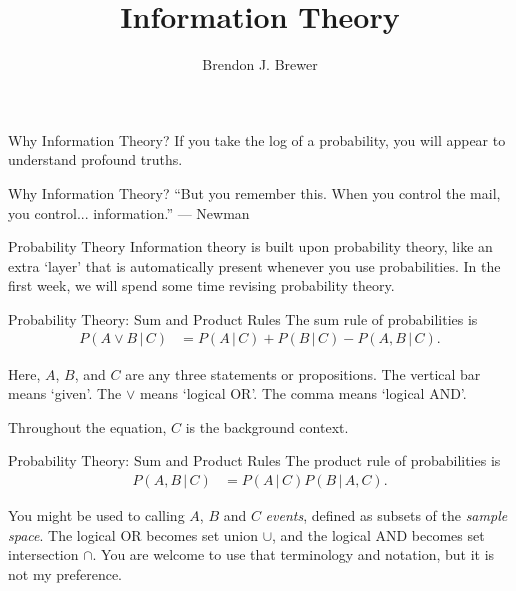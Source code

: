 \documentclass{beamer}
\title{Information Theory}
\author{Brendon J. Brewer}
\newcommand{\given}{\,|\,}
\begin{document}
\maketitle

\begin{frame}{Why Information Theory?}
If you take the log of a probability, you will appear to understand
profound truths.

\end{frame}


\begin{frame}{Why Information Theory?}
``But you remember this. When you control the mail, you control... information.''
--- Newman
\end{frame}


\begin{frame}{Probability Theory}
Information theory is built upon probability theory, like an extra `layer'
that is automatically present whenever you use probabilities.
In the first week, we will spend some time revising probability theory.
\end{frame}


\begin{frame}{Probability Theory: Sum and Product Rules}
The sum rule of probabilities is
\begin{align}
P(A \vee B \given C) &= P(A \given C) + P(B \given C) - P(A, B \given C).
\end{align}

\pause

Here, $A$, $B$, and $C$ are any three statements or propositions.
The vertical bar means `given'. The $\vee$ means `logical OR'.
The comma means `logical AND'.

\pause

Throughout the equation, $C$ is the background context.

\end{frame}



\begin{frame}{Probability Theory: Sum and Product Rules}
The product rule of probabilities is
\begin{align}
P(A, B \given C) &= P(A \given C)P(B \given A, C).
\end{align}

\pause

You might be used to calling $A$, $B$ and $C$ {\em events}, defined as subsets
of the {\em sample space}. The logical OR becomes set union $\cup$,
and the logical AND becomes set intersection $\cap$. You are welcome to use
that terminology and notation, but it is not my preference.

\end{frame}
\end{document}
